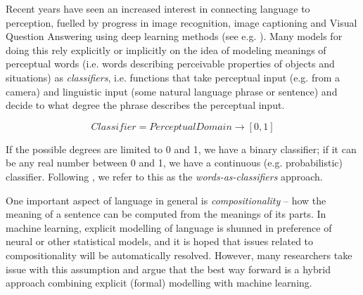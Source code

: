 \documentclass[11pt,a4paper]{article}
\begin{document}


Recent years have seen %
an increased interest in connecting language to perception, fuelled by progress in image recognition, image captioning and Visual Question Answering using deep learning methods (see e.g. ). Many models for doing this rely explicitly or implicitly on the idea of modeling meanings of perceptual words (i.e. words describing perceivable properties of objects and situations) as \emph{classifiers}, i.e. functions that take perceptual input (e.g. from a camera) and linguistic input (some natural language phrase or sentence) and decide to what degree the phrase describes the perceptual input. %

\[Classifier = PerceptualDomain \to [0,1] \]

If the possible degrees are limited to 0 and 1, we have a binary classifier; if it can be any real number between 0 and 1, we have a continuous (e.g. probabilistic) classifier. Following \cite{schlangen16}, we refer to this as the \emph{words-as-classifiers} approach. 





One important aspect of language in general is \emph{compositionality} -- how the meaning of a sentence can be computed from the meanings of its parts. In  machine learning,  explicit modelling of language  is shunned in preference of neural or other  statistical models, and it is hoped that issues related to compositionality will be automatically resolved. However, many researchers take issue with this assumption and argue that the best way forward is a hybrid approach combining explicit (formal) modelling with machine learning. 
\end{document}
